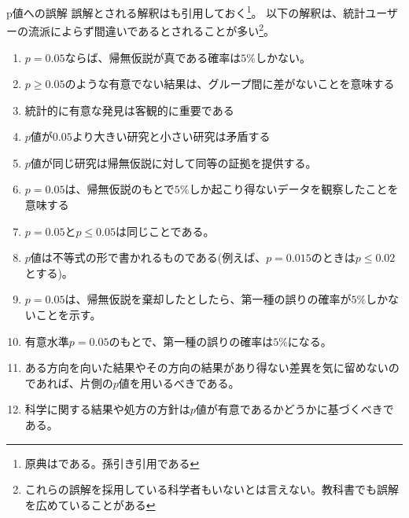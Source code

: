 \begin{SMbox}{p値への誤解}
    誤解とされる解釈はも引用しておく\cite{idiot_statistics2014}\footnote{原典は\cite{GOODMAN2008135}である。孫引き引用である}。
    以下の解釈は、統計ユーザーの流派によらず間違いであるとされることが多い\footnote{これらの誤解を採用している科学者もいないとは言えない。教科書でも誤解を広めていることがある}。
    \begin{enumerate}
        \item $p=0.05$ならば、帰無仮説が真である確率は$5\%$しかない。
        \item $p\geq 0.05$のような有意でない結果は、グループ間に差がないことを意味する
        \item 統計的に有意な発見は客観的に重要である
        \item $p$値が$0.05$より大きい研究と小さい研究は矛盾する
        \item $p$値が同じ研究は帰無仮説に対して同等の証拠を提供する。
        \item $p=0.05$は、帰無仮説のもとで$5\%$しか起こり得ないデータを観察したことを意味する
        \item $p=0.05$と$p\leq 0.05$は同じことである。
        \item $p$値は不等式の形で書かれるものである(例えば、$p=0.015$のときは$p\leq 0.02$とする)。
        \item $p=0.05$は、帰無仮説を棄却したとしたら、第一種の誤りの確率が$5\%$しかないことを示す。
        \item 有意水準$p=0.05$のもとで、第一種の誤りの確率は$5\%$になる。
        \item ある方向を向いた結果やその方向の結果があり得ない差異を気に留めないのであれば、片側の$p$値を用いるべきである。
        \item 科学に関する結果や処方の方針は$p$値が有意であるかどうかに基づくべきである。
    \end{enumerate}
\end{SMbox}


